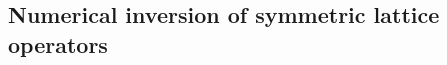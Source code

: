 \documentclass[12pt,a4paper]{article}
\newcommand{\Sop}{\mathcal{S}}
\begin{document}

\subsection{Numerical inversion of symmetric lattice operators}
\end{document}

